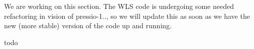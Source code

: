 We are working on this section. The WLS code is undergoing some needed refactoring in vision of pressio-\/1.., so we will update this as soon as we have the new (more stable) version of the code up and running.

todo 